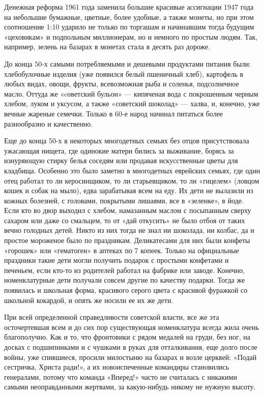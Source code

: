 Денежная реформа 1961 года заменила большие красивые ассигнации 1947 года на
небольшие бумажные, цветные, более удобные, а также монеты, но при этом
соотношение 1:10 ударило не только по торгашам и начинавшим тогда будущим
«цеховикам» и подпольным миллионерам, но и немного по простым людям. Так,
например, зелень на базарах в монетах стала в десять раз дороже. 

До конца 50-х самыми потребляемыми и дешевыми продуктами питания были:
хлебобулочные изделия (уже появился белый пшеничный хлеб), картофель в любых
видах, овощи, фрукты, всевозможная рыба и соленья, подсолнечное масло. Оттуда
же «cоветский бульон» --- кипяченая вода с покрошенным черным хлебом, луком и
уксусом, а также «советский шоколад» --- халва, и, конечно, уже вечные жареные
семечки. Только в 60-е народ начинал питаться более разнообразно и качественно. 

Еще до конца 50-х в некоторых многодетных семьях без отцов присутствовала
ужасающая нищета, где одинокие матери бились за выживание, борясь за изнуряющую
стирку белья соседям или продавая искусственные цветы для кладбища. Особенно
это было заметно в многодетных еврейских семьях, где один отец работал то ли
керосинщиком, то ли старьевщиком, то ли «гицелем» (ловцом кошек и собак на
мыло), едва зарабатывая всем на еду. Их дети не вылазили из кожных болезней, с
головами, покрытыми лишаями, все в «зеленке», в йоде. Если кто во двор выходил
с хлебом, намазанным маслом с посыпанным сверху сахаром или даже со смальцем,
то от «дай откусить» не было отбоя от таких вечно голодных детей. Никто из них
тогда не знал ни шоколада, ни колбас, да и простое мороженое было по
праздникам. Деликатесами для них были конфеты «горошек» или «гематоген» в
аптеках по 7 копеек. Только на официальные праздники такие дети могли получить
подарок с простыми конфетами и печеньем, если кто-то из родителей работал на
фабрике или заводе. Конечно, номенклатурные дети получали совсем другие по
качеству подарки. Тогда же появилась и школьная форма, красивого серого цвета с
красивой фуражкой со школьной кокардой, и опять же носили ее их же дети. 

При всей определенной справедливости советской власти, все же эта осточертевшая
всем и до сих пор существующая номенклатура всегда жила очень благополучно. Как
и то, что фронтовики с рядом медалей на груди, без ног, на досках с
подшипниками и с чушками в руках для отталкивания, еще долго после войны, уже
спившиеся, просили милостыню на базарах и возле церквей: «Подай сестричка,
Христа ради!», а их новоиспеченные командиры становились генералами, потому что
команда «Вперед!» часто не считалась с никакими самыми неоправданными жертвами,
за какую-нибудь никому не нужную высоту.

